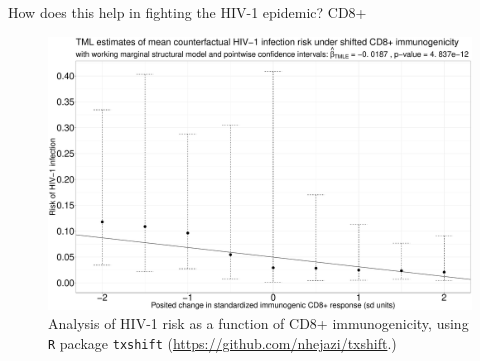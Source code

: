 \documentclass{beamer}
\begin{document}

\begin{frame}[c]{How does this help in fighting the HIV-1 epidemic? CD8+}

\vspace{-2em}
\begin{figure}[H]
  \centering
  \includegraphics[scale=0.21]{cd8_msm_tmle_summary}
  \caption{
    Analysis of HIV-1 risk as a function of CD8+ immunogenicity, using
    \texttt{R} package \texttt{txshift}
    (\url{https://github.com/nhejazi/txshift}.)
  }
\end{figure}

\note{
}

\end{frame}


\setbeamercovered{}
\beamerdefaultoverlayspecification{}

\begin{frame}[c,allowframebreaks]{}

\scriptsize



\end{frame}

\end{document}
